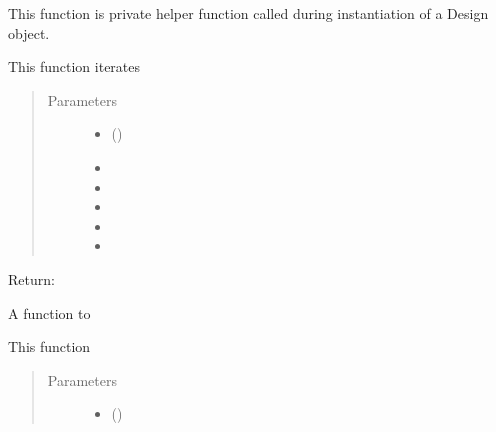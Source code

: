 \documentclass[letterpaper,10pt,english,openany,oneside]{sphinxmanual}
\begin{document}
\begin{fulllineitems}
\begin{fulllineitems}
This function is private helper function called during instantiation of a Design object.

This function iterates
\begin{quote}\begin{description}
\item[{Parameters}] \leavevmode\begin{itemize}
\item {} 
\sphinxstyleliteralstrong{\sphinxupquote{(}}\sphinxstyleliteralstrong{\sphinxupquote{)}} () \textendash{} 

\item {} 
\sphinxstyleliteralstrong{\sphinxupquote{(}}\sphinxstyleliteralstrong{\sphinxupquote{)}} \textendash{} 

\item {} 
\sphinxstyleliteralstrong{\sphinxupquote{(}}\sphinxstyleliteralstrong{\sphinxupquote{)}} \textendash{} 

\item {} 
\sphinxstyleliteralstrong{\sphinxupquote{(}}\sphinxstyleliteralstrong{\sphinxupquote{)}} \textendash{} 

\item {} 
\sphinxstyleliteralstrong{\sphinxupquote{(}}\sphinxstyleliteralstrong{\sphinxupquote{)}} \textendash{} 

\item {} 
\sphinxstyleliteralstrong{\sphinxupquote{(}}\sphinxstyleliteralstrong{\sphinxupquote{)}} \textendash{} 

\end{itemize}

\end{description}\end{quote}

Return:

\end{fulllineitems}


\begin{fulllineitems}
\label{\detokenize{nloed:nloed.design.Design.__create_grid}}
A function to

This function
\begin{quote}\begin{description}
\item[{Parameters}] \leavevmode\begin{itemize}
\item {} 
\sphinxstyleliteralstrong{\sphinxupquote{(}}\sphinxstyleliteralstrong{\sphinxupquote{)}} () \textendash{} 


\end{itemize}
\end{description}
\end{quote}
\end{fulllineitems}
\end{fulllineitems}
\end{document}
